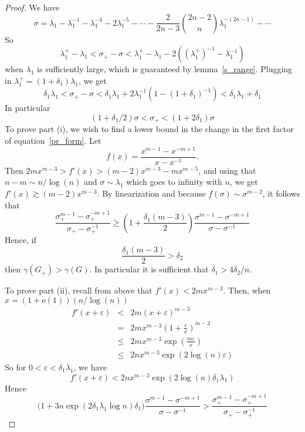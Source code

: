 \begin{proof}
  We have
  \[\sigma = \lambda_1 - \lambda_1^{-1} - \lambda_1^{-3} - 2 \lambda_1^{-5} - \cdots - \frac{2}{2n-3} \binom{2n-2}{n} \lambda_1^{-(2n-1)}- \cdots\]
  So
   \[ \lambda_1^+ - \lambda_1 < \sigma_+ - \sigma < \lambda_1^+ - \lambda_1 - 2((\lambda_1^+)^{-1} - \lambda_1^{-1})\]
  when $\lambda_1$ is sufficiently large, which is guaranteed by lemma~\ref{s_range}.
  Plugging in $\lambda_1^+ = (1 + \delta_1) \lambda_1$, we get
   \[ \delta_1 \lambda_1 < \sigma_+ - \sigma < \delta_1 \lambda_1 + 2 \lambda_1^{-1}(1 - (1+\delta_1)^{-1}) < \delta_1 \lambda_1 + \delta_1\]
  In particular
   \[ (1+\delta_1/2) \sigma < \sigma_+ < (1+2 \delta_1) \sigma\]
  To prove part (i), we wish to find a lower bound in the change in the first factor of
  equation~\ref{pr_form}.  Let
   \[ f(x) = \frac{x^{m-1} - x^{-m+1}}{x-x^{-1}}. \]
  Then $2m x^{m-3} > f'(x) > (m-2) x^{m-3} - m x^{m-5}$, and using
  that $n-m \sim  n/\log(n)$ and $\sigma \sim \lambda_1$ which goes to infinity with $n$,
  we get $f'(x) \gtrsim (m-2) x^{m-3}$.  By linearization and because $f(\sigma) \sim \sigma^{m-2}$, it follows that
   \[ \frac{\sigma_+^{m-1} - \sigma_+^{-m+1}}{\sigma_+ - \sigma_+^{-1}} \geq \left(1 + \frac{\delta_1 (m-3)}{2}\right) \frac{\sigma^{m-1} - \sigma^{-m+1}}{\sigma - \sigma^{-1}}\]
  Hence, if
   \[ \frac{\delta_1 (m-3)}{2} > \delta_2\]
  then $\gamma(G_+) > \gamma(G)$.  In particular it
  is sufficient that $\delta_1 > 4\delta_2 / n$.


  To prove part (ii), recall from above that $f'(x) < 2m x^{m-3}$.
  Then, when $x = (1+o(1)) (n / \log(n))$
   \begin{eqnarray*}
     f'(x+\varepsilon) & < & 2m (x+\varepsilon)^{m-3} \\
     & = & 2m x^{m-3} \left( 1 + \frac{\varepsilon}{x} \right)^{m-3}\\
     & \leq & 2m x^{m-3} \exp\left(\frac{m \varepsilon}{x}\right) \\
     & \leq & 2n x^{m-3} \exp(2 \log(n) \varepsilon) 
   \end{eqnarray*}
  So for $0 < \varepsilon < \delta_1 \lambda_1$, we have
   \[ f'(x+\varepsilon) < 2n x^{m-3} \exp(2 \log(n) \delta_1 \lambda_1) \]
  Hence
   \[ \big( 1 + 3n \exp(2 \delta_1 \lambda_1 \log n ) \delta_1 \big) \frac{\sigma^{m-1} - \sigma^{-m+1}}{\sigma - \sigma^{-1}} >  \frac{\sigma_+^{m-1} - \sigma_+^{-m+1}}{\sigma_+ - \sigma_+^{-1}} \]
   
  
\end{proof}

